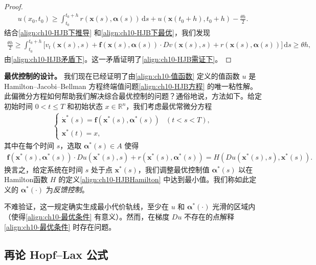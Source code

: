 \documentclass[../../main.tex]{subfiles}
\begin{document}
\begin{proof}
\begin{align}
u(x_0,t_0)\geqslant \int_{t_0}^{t_0+h}r(\mathbf{x}(s),\boldsymbol{\alpha}(s))\,\mathrm{d}s+u(\mathbf{x}(t_0+h),t_0+h)-\frac{\theta h}{2}.
\label{align:ch10-HJB下最优}
\end{align}
结合\eqref{align:ch10-HJB下推导} 和\eqref{align:ch10-HJB下最优}，我们发现
\begin{align*}
\frac{\theta h}{2}\geqslant \int_{t_0}^{t_0+h}\big[v_t(\mathbf{x}(s),s)+\mathbf{f}(\mathbf{x}(s),\boldsymbol{\alpha}(s))\cdot Dv(\mathbf{x}(s),s)+r(\mathbf{x}(s),\boldsymbol{\alpha}(s))\big]\,\mathrm{d}s\geqslant\theta h,
\end{align*}
由\eqref{align:ch10-HJB矛盾下}。这一矛盾证明了\eqref{align:ch10-HJB需证下}。
\end{proof}

\textbf{最优控制的设计。} 我们现在已经证明了由\eqref{align:ch10-值函数} 定义的值函数 $u$ 是Hamilton--Jacobi--Bellman 方程终端值问题\eqref{align:ch10-HJB方程} 的唯一粘性解。此偏微分方程如何帮助我们解决综合最优控制的问题？通俗地说，方法如下。给定初始时间 $0<t\leqslant T$ 和初始状态 $x\in\mathbb{R}^n$，我们考虑最优常微分方程
\begin{align}
\begin{cases}
\dot{\mathbf{x}}^*(s)=\mathbf{f}(\mathbf{x}^*(s),\boldsymbol{\alpha}^*(s)) & (t<s<T),\\
\mathbf{x}^*(t)=x,
\end{cases}
\label{align:ch10-最优轨线}
\end{align}
其中在每个时间 $s$，选取 $\boldsymbol{\alpha}^*(s)\in A$ 使得
\begin{align}
\mathbf{f}(\mathbf{x}^*(s),\boldsymbol{\alpha}^*(s))\cdot Du(\mathbf{x}^*(s),s)+r(\mathbf{x}^*(s),\boldsymbol{\alpha}^*(s))=H(Du(\mathbf{x}^*(s),s),\mathbf{x}^*(s)).
\label{align:ch10-最优条件}
\end{align}
换言之，给定系统在时间 $s$ 处于点 $\mathbf{x}^*(s)$，我们调整最优控制值 $\boldsymbol{\alpha}^*(s)$ 以在Hamilton函数 $H$ 的定义\eqref{align:ch10-HJBHamilton} 中达到最小值。我们称如此定义的 $\boldsymbol{\alpha}^*(\cdot)$ 为\emph{反馈控制}。

不难验证，这一规定确实生成最小代价轨线，至少在 $u$ 和 $\boldsymbol{\alpha}^*(\cdot)$ 光滑的区域内（使得\eqref{align:ch10-最优条件} 有意义）。然而，在梯度 $Du$ 不存在的点解释\eqref{align:ch10-最优条件} 时存在问题。

\subsection{再论 Hopf--Lax 公式}\label{subsection:ch10-HopfLax再论}
\end{document}

